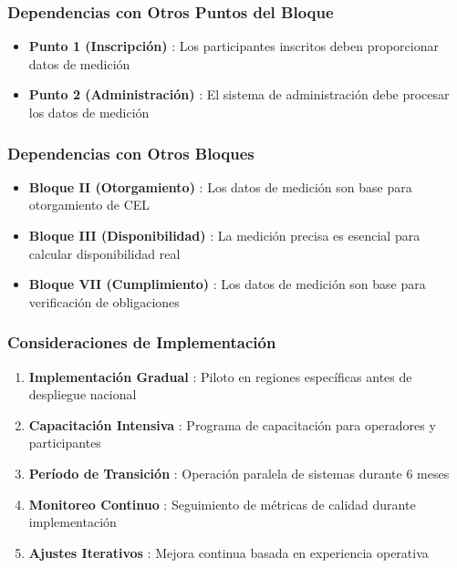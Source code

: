 \documentclass{cel}
\begin{document}
\subsubsection{Dependencias con Otros Puntos del Bloque}
\nopagebreak

\begin{itemize}
\item \textbf{Punto 1 (Inscripción)} : Los participantes inscritos deben proporcionar datos de medición
\item \textbf{Punto 2 (Administración)} : El sistema de administración debe procesar los datos de medición

\end{itemize}
\subsubsection{Dependencias con Otros Bloques}
\nopagebreak

\begin{itemize}
\item \textbf{Bloque II (Otorgamiento)} : Los datos de medición son base para otorgamiento de CEL
\item \textbf{Bloque III (Disponibilidad)} : La medición precisa es esencial para calcular disponibilidad real
\item \textbf{Bloque VII (Cumplimiento)} : Los datos de medición son base para verificación de obligaciones

\end{itemize}
\subsubsection{Consideraciones de Implementación}
\nopagebreak

\begin{enumerate}
\item \textbf{Implementación Gradual} : Piloto en regiones específicas antes de despliegue nacional
\item \textbf{Capacitación Intensiva} : Programa de capacitación para operadores y participantes
\item \textbf{Período de Transición} : Operación paralela de sistemas durante 6 meses
\item \textbf{Monitoreo Continuo} : Seguimiento de métricas de calidad durante implementación
\item \textbf{Ajustes Iterativos} : Mejora continua basada en experiencia operativa


\end{enumerate}
\end{document}
